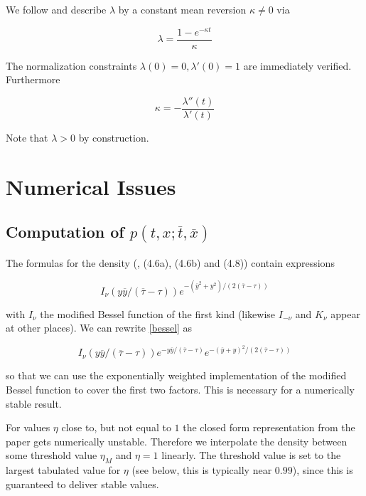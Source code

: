 \documentclass{amsart}
\theoremstyle{plain}
\numberwithin{equation}{section}
\begin{document}
We follow \cite{piterbarg} and describe $\lambda$ by a constant mean reversion $\kappa \neq 0$ via

\begin{equation}
\lambda = \frac{1 - e^{-\kappa t}}{\kappa}
\end{equation}

The normalization constraints $\lambda(0)=0, \lambda'(0)=1$ are immediately verified. Furthermore

\begin{equation}
\kappa = -\frac{\lambda''(t)}{\lambda'(t)}
\end{equation}

Note that $\lambda > 0$ by construction.

\section{Numerical Issues}

\subsection{Computation of $p(t,x;\overline{t},\overline{x})$}

The formulas for the density (\cite{betaeta}, (4.6a), (4.6b) and (4.8)) contain expressions

\begin{equation}\label{bessel}
I_\nu(y\overline{y}/(\overline{\tau}-\tau)) e^{-(\overline{y}^2+y^2)/(2(\overline{\tau}-\tau))}
\end{equation}

with $I_\nu$ the modified Bessel function of the first kind (likewise $I_{-\nu}$ and $K_\nu$ appear at other places). We can rewrite \ref{bessel} as

\begin{equation}
I_\nu(y\overline{y}/(\overline{\tau}-\tau))e^{-y\overline{y}/(\overline{\tau}-\tau)} e^{-(\overline{y}+y)^2/(2(\overline{\tau}-\tau))}
\end{equation}

so that we can use the exponentially weighted implementation of the modified Bessel function to cover the first two factors. This is necessary for a numerically stable result.

For values $\eta$ close to, but not equal to $1$ the closed form representation from the paper gets numerically unstable. Therefore we interpolate the density between some threshold value $\eta_M$ and $\eta=1$ linearly. The threshold value is set to the largest tabulated value for $\eta$ (see below, this is typically near $0.99$), since this is guaranteed to deliver stable values.
\end{document}

